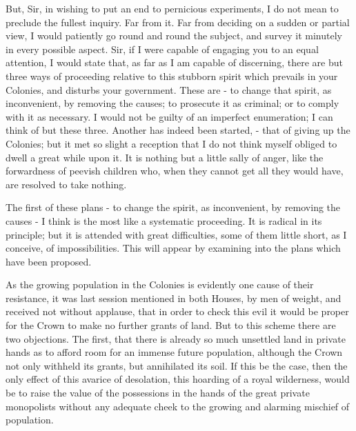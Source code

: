 But, Sir, in wishing to put an end to pernicious experiments, I do not mean to preclude the fullest inquiry. Far from it. Far from deciding on a sudden or partial view, I would patiently go round and round the subject, and survey it minutely in every possible aspect. Sir, if I were capable of engaging you to an equal attention, I would state that, as far as I am capable of discerning, there are but three ways of proceeding relative to this stubborn spirit which prevails in your Colonies, and disturbs your government. These are - to change that spirit, as inconvenient, by removing the causes; to prosecute it as criminal; or to comply with it as necessary. I would not be guilty of an imperfect enumeration; I can think of but these three. Another has indeed been started, - that of giving up the Colonies; but it met so slight a reception that I do not think myself obliged to dwell a great while upon it. It is nothing but a little sally of anger, like the forwardness of peevish children who, when they cannot get all they would have, are resolved to take nothing.\par

The first of these plans - to change the spirit, as inconvenient, by removing the causes - I think is the most like a systematic proceeding. It is radical in its principle; but it is attended with great difficulties, some of them little short, as I conceive, of impossibilities. This will appear by examining into the plans which have been proposed.\par

As the growing population in the Colonies is evidently one cause of their resistance, it was last session mentioned in both Houses, by men of weight, and received not without applause, that in order to check this evil it would be proper for the Crown to make no further grants of land. But to this scheme there are two objections. The first, that there is already so much unsettled land in private hands as to afford room for an immense future population, although the Crown not only withheld its grants, but annihilated its soil. If this be the case, then the only effect of this avarice of desolation, this hoarding of a royal wilderness, would be to raise the value of the possessions in the hands of the great private monopolists without any adequate cheek to the growing and alarming mischief of population.\par


